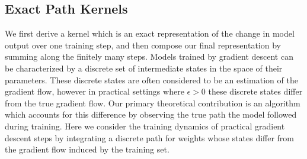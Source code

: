 \subsection{Exact Path Kernels}

 We first derive a kernel which is an exact representation of the change in model output over one training step, and then compose our final representation by summing along the finitely many steps.
Models trained by gradient descent can be characterized by a discrete set of intermediate states in the space of their parameters.
These discrete states are often considered to be an estimation of the gradient flow, however in practical settings where $\epsilon > 0$ these discrete states differ from the true gradient flow.
Our primary theoretical contribution is an algorithm which accounts for this difference by observing the true path the model followed during training.
Here we consider the training dynamics of practical gradient descent steps by integrating a discrete path for weights whose states differ from the gradient flow induced by the training set.

